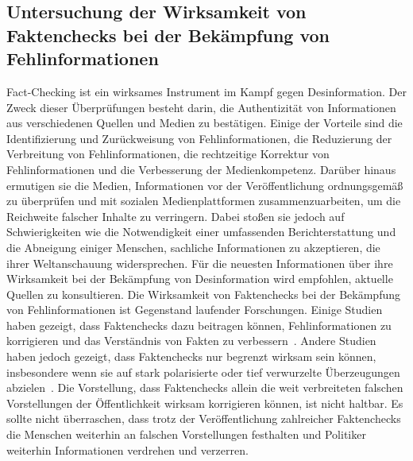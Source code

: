 \documentclass[a4paper,listof=totoc,bibliography=totoc]{scrartcl}
\begin{document}
\subsection{Untersuchung der Wirksamkeit von Faktenchecks bei der Bekämpfung von Fehlinformationen}

Fact-Checking ist ein wirksames Instrument im Kampf gegen Desinformation. Der Zweck dieser Überprüfungen besteht darin, die Authentizität von Informationen aus 
verschiedenen Quellen und Medien zu bestätigen. Einige der Vorteile sind die Identifizierung und Zurückweisung von Fehlinformationen, die Reduzierung der Verbreitung 
von Fehlinformationen, die rechtzeitige Korrektur von Fehlinformationen und die Verbesserung der Medienkompetenz. Darüber hinaus ermutigen sie die Medien, Informationen 
vor der Veröffentlichung ordnungsgemäß zu überprüfen und mit sozialen Medienplattformen zusammenzuarbeiten, um die Reichweite falscher Inhalte zu verringern. Dabei 
stoßen sie jedoch auf Schwierigkeiten wie die Notwendigkeit einer umfassenden Berichterstattung und die Abneigung einiger Menschen, sachliche Informationen zu akzeptieren, 
die ihrer Weltanschauung widersprechen. Für die neuesten Informationen über ihre Wirksamkeit bei der Bekämpfung von Desinformation wird empfohlen, aktuelle Quellen zu konsultieren.
Die Wirksamkeit von Faktenchecks bei der Bekämpfung von Fehlinformationen ist Gegenstand laufender Forschungen. Einige Studien haben gezeigt, dass Faktenchecks 
dazu beitragen können, Fehlinformationen zu korrigieren und das Verständnis von Fakten zu verbessern~\cite{amazeen2018}. Andere Studien haben jedoch gezeigt, dass Faktenchecks nur 
begrenzt wirksam sein können, insbesondere wenn sie auf stark polarisierte oder tief verwurzelte Überzeugungen abzielen~\cite{nyhan2010}. Die Vorstellung, dass Faktenchecks allein 
die weit verbreiteten falschen Vorstellungen der Öffentlichkeit wirksam korrigieren können, ist nicht haltbar. Es sollte nicht überraschen, dass trotz der Veröffentlichung zahlreicher 
Faktenchecks die Menschen weiterhin an falschen Vorstellungen festhalten und Politiker weiterhin Informationen verdrehen und verzerren.\newline
\end{document}
